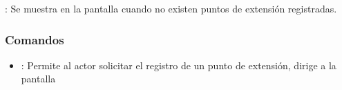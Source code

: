 \begin{Citemize}
	\item {}: Se muestra en la pantalla  cuando no existen puntos de extensión registradas.
\end{Citemize}

\label{IU6-1-3A}
\subsubsection{Comandos}
\begin{itemize}
	\item {}: Permite al actor solicitar el registro de un punto de extensión, dirige a la pantalla 
\end{itemize}